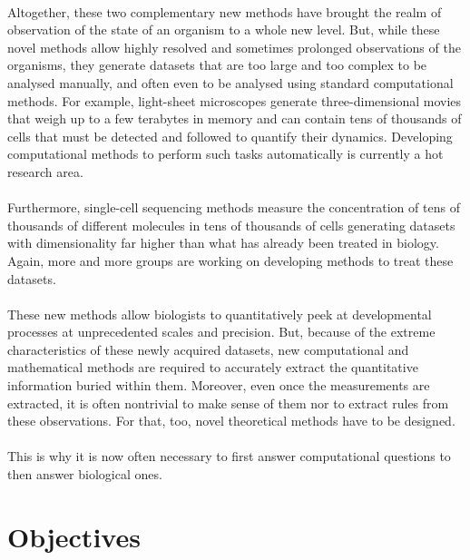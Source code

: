 \paragraph{}Altogether, these two complementary new methods have brought the realm of observation of the state of an organism to a whole new level.
But, while these novel methods allow highly resolved and sometimes prolonged observations of the organisms, they generate datasets that are too large and too complex to be analysed manually, and often even to be analysed using standard computational methods.
For example, light-sheet microscopes generate three-dimensional movies that weigh up to a few terabytes in memory and can contain tens of thousands of cells that must be detected and followed to quantify their dynamics.
Developing computational methods to perform such tasks automatically is currently a hot research area.
\paragraph{}Furthermore, single-cell sequencing methods measure the concentration of tens of thousands of different molecules in tens of thousands of cells generating datasets with dimensionality far higher than what has already been treated in biology.
Again, more and more groups are working on developing methods to treat these datasets.
\paragraph{}These new methods allow biologists to quantitatively peek at developmental processes at unprecedented scales and precision.
But, because of the extreme characteristics of these newly acquired datasets, new computational and mathematical methods are required to accurately extract the quantitative information buried within them.
Moreover, even once the measurements are extracted, it is often nontrivial to make sense of them nor to extract rules from these observations.
For that, too, novel theoretical methods have to be designed.
\paragraph{}This is why it is now often necessary to first answer computational questions to then answer biological ones.
\section*{Objectives}
